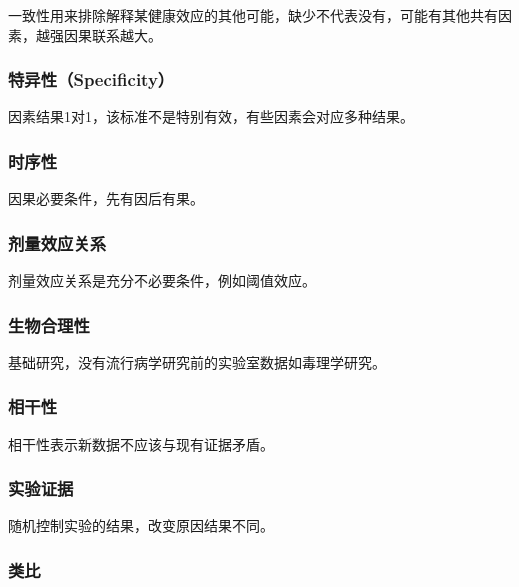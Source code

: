 \documentclass[
]{book}
\begin{document}
一致性用来排除解释某健康效应的其他可能，缺少不代表没有，可能有其他共有因素，越强因果联系越大。

\hypertarget{ux7279ux5f02ux6027specificity}{%
\subsubsection{特异性（Specificity）}\label{ux7279ux5f02ux6027specificity}}

因素结果1对1，该标准不是特别有效，有些因素会对应多种结果。

\hypertarget{ux65f6ux5e8fux6027}{%
\subsubsection{时序性}\label{ux65f6ux5e8fux6027}}

因果必要条件，先有因后有果。

\hypertarget{ux5242ux91cfux6548ux5e94ux5173ux7cfb}{%
\subsubsection{剂量效应关系}\label{ux5242ux91cfux6548ux5e94ux5173ux7cfb}}

剂量效应关系是充分不必要条件，例如阈值效应。

\hypertarget{ux751fux7269ux5408ux7406ux6027}{%
\subsubsection{生物合理性}\label{ux751fux7269ux5408ux7406ux6027}}

基础研究，没有流行病学研究前的实验室数据如毒理学研究。

\hypertarget{ux76f8ux5e72ux6027}{%
\subsubsection{相干性}\label{ux76f8ux5e72ux6027}}

相干性表示新数据不应该与现有证据矛盾。

\hypertarget{ux5b9eux9a8cux8bc1ux636e}{%
\subsubsection{实验证据}\label{ux5b9eux9a8cux8bc1ux636e}}

随机控制实验的结果，改变原因结果不同。

\hypertarget{ux7c7bux6bd4}{%
\subsubsection{类比}\label{ux7c7bux6bd4}}
\end{document}
